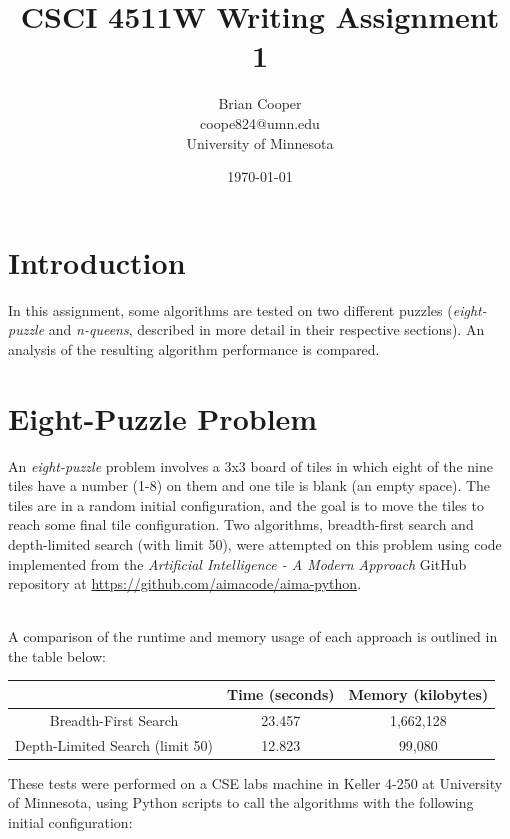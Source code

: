 \documentclass{article}
\title{CSCI 4511W Writing Assignment 1}
\author{Brian Cooper \\ coope824@umn.edu \\ University of Minnesota}
\date{\today}
\begin{document}
\maketitle

\section{Introduction}
In this assignment, some algorithms are tested on two different puzzles (\textit{eight-puzzle} and \textit{n-queens}, described in more detail in their respective sections). An analysis of the resulting algorithm performance is compared.

\section{Eight-Puzzle Problem}

An \textit{eight-puzzle} problem involves a 3x3 board of tiles in which eight of the nine tiles have a number (1-8) on them and one tile is blank (an empty space). The tiles are in a random initial configuration, and the goal is to move the tiles to reach some final tile configuration. Two algorithms, breadth-first search and depth-limited search (with limit 50), were attempted on this problem using code implemented from the \textit{Artificial Intelligence - A Modern Approach} GitHub repository at \url{https://github.com/aimacode/aima-python}.
\\\
\begin{center}
    A comparison of the runtime and memory usage of each approach is outlined in the table below:
\end{center}

    \begin{table}[H]
        \centering
        \begin{tabular}{c|c|c|}
        \cline{2-3}
                                                              & Time (seconds) & Memory (kilobytes) \\ \hline
        \multicolumn{1}{|c|}{Breadth-First Search}            & 23.457    & 1,662,128      \\ \hline
        \multicolumn{1}{|c|}{Depth-Limited Search (limit 50)} & 12.823    &   99,080      \\ \hline
        \end{tabular}
    \end{table}

These tests were performed on a CSE labs machine in Keller 4-250 at University of Minnesota, using Python scripts to call the algorithms with the following initial configuration:
\end{document}
